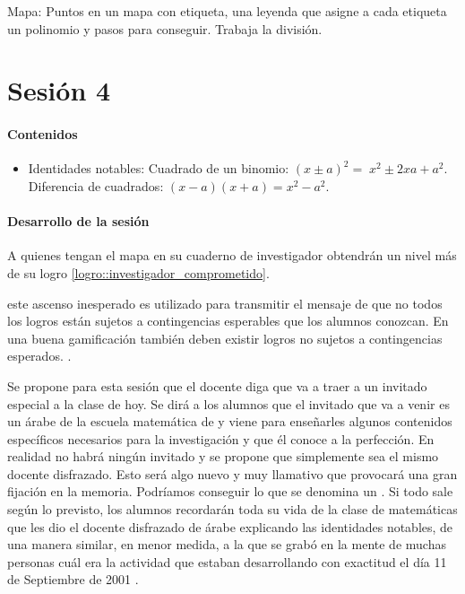 Mapa: Puntos en un mapa con etiqueta, una leyenda que asigne a cada etiqueta un polinomio y pasos para conseguir.
%
Trabaja la división.





\section{Sesión 4}


\paragraph{Contenidos}
\begin{itemize}
	\item Identidades notables: 
	\subitem Cuadrado de un binomio: $(x\pm a)^2 = \;x^2\pm 2xa + a^2$.
	\subitem Diferencia de cuadrados: $(x-a)(x+a) = x^2-a^2$.
\end{itemize}

\paragraph{Desarrollo de la sesión}

A quienes tengan el mapa en su cuaderno de investigador obtendrán un nivel más de su logro \ref{logro::investigador_comprometido}.

\Justificacion{} este ascenso inesperado es utilizado para transmitir el mensaje de que no todos los logros están sujetos a contingencias esperables que los alumnos conozcan.
%
En una buena gamificación también deben existir logros no sujetos a contingencias esperados. \citep{werbach2012win}.

Se propone para esta sesión que el docente diga que va a traer a un invitado especial a la clase de hoy.
%
Se dirá a los alumnos que el invitado que va a venir es un árabe de la escuela matemática de \arab y viene para enseñarles algunos contenidos específicos necesarios para la investigación y que él conoce a la perfección.
%
En realidad no habrá ningún invitado y se propone que simplemente sea el mismo docente disfrazado.
%
Esto será algo nuevo y muy llamativo que provocará una gran fijación en la memoria.
%
Podríamos conseguir lo que se denomina un .
Si todo sale según lo previsto, los alumnos recordarán toda su vida de la clase de matemáticas que les dio el docente disfrazado de árabe explicando las identidades notables, 
%
de una manera similar, en menor medida, a la que se grabó en la mente de muchas personas cuál era la actividad que estaban desarrollando con exactitud el día 11 de Septiembre de 2001 \citep{11s}.

